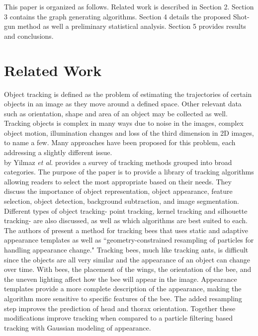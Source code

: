 \documentclass[12pt]{article}
\begin{document}
\indent This paper is organized as follows. Related work is described in Section 2. Section 3 contains the graph generating algorithms. Section 4 details the proposed Shot-gun method as well a preliminary statistical analysis. Section 5 provides results and conclusions.

\section{Related Work}
Object tracking is defined as the problem of estimating the trajectories of certain objects in an image as they move around a defined space. Other relevant data such as orientation, shape and area of an object may be collected as well. Tracking objects is complex in many ways due to noise in the images, complex object motion, illumination changes and loss of the third dimension in 2D images, to name a few. Many approaches have been proposed for this problem, each addressing a slightly different issue.\\
\indent  \cite{Yilmaz06}  by Yilmaz {\it et al.} provides a survey of tracking methods grouped into broad categories. The purpose of the paper is to provide a library of tracking algorithms allowing readers to select the most appropriate based on their needs. They discuss the importance of object representation, object appearance, feature selection, object detection, background subtraction, and image segmentation. Different types of object tracking- point tracking, kernel tracking and silhouette tracking- are also discussed, as well as which algorithms are best suited to each. \\
\indent The authors of \cite{Maitra09} present a method for tracking bees that uses static and adaptive appearance templates as well as ``geometry-constrained resampling of particles for handling appearance change." Tracking bees, much like tracking ants, is difficult since the objects are all very similar and the appearance of an object can change over time. With bees, the placement of the wings, the orientation of the bee, and the uneven lighting affect how the bee will appear in the image. Appearance templates provide a more complete description of the appearance, making the algorithm more sensitive to specific features of the bee. The added resampling step improves the prediction of head and thorax orientation. Together these modifications improve tracking when compared to a particle filtering based tracking with Gaussian modeling of appearance.\\
\end{document}
